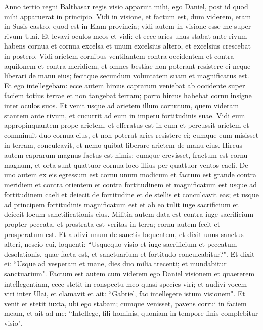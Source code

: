 \begin{biblechapter}  
\verse Anno tertio regni Balthasar regis visio apparuit mihi, ego Daniel, post id quod mihi apparuerat in principio. 
\verse Vidi in visione, et factum est, dum viderem, eram in Susis castro, quod est in Elam provincia; vidi autem in visione esse me super rivum Ulai. 
\verse Et levavi oculos meos et vidi: et ecce aries unus stabat ante rivum habens cornua et cornua excelsa et unum excelsius altero, et excelsius crescebat in postero. 
\verse Vidi arietem cornibus ventilantem contra occidentem et contra aquilonem et contra meridiem, et omnes bestiae non poterant resistere ei neque liberari de manu eius; fecitque secundum voluntatem suam et magnificatus est. 
\verse Et ego intellegebam: ecce autem hircus caprarum veniebat ab occidente super faciem totius terrae et non tangebat terram; porro hircus habebat cornu insigne inter oculos suos. 
\verse Et venit usque ad arietem illum cornutum, quem videram stantem ante rivum, et cucurrit ad eum in impetu fortitudinis suae. 
\verse Vidi eum appropinquantem prope arietem, et efferatus est in eum et percussit arietem et comminuit duo cornua eius, et non poterat aries resistere ei; cumque eum misisset in terram, conculcavit, et nemo quibat liberare arietem de manu eius. 
\verse Hircus autem caprarum magnus factus est nimis; cumque crevisset, fractum est cornu magnum, et orta sunt quattuor cornua loco illius per quattuor ventos caeli. 
\verse De uno autem ex eis egressum est cornu unum modicum et factum est grande contra meridiem et contra orientem et contra fortitudinem 
\verse et magnificatum est usque ad fortitudinem caeli et deiecit de fortitudine et de stellis et conculcavit eas; 
\verse et usque ad principem fortitudinis magnificatum est et ab eo tulit iuge sacrificium et deiecit locum sanctificationis eius. 
\verse Militia autem data est contra iuge sacrificium propter peccata, et prostrata est veritas in terra; cornu autem fecit et prosperatum est. 
\verse Et audivi unum de sanctis loquentem, et dixit unus sanctus alteri, nescio cui, loquenti: “Usquequo visio et iuge sacrificium et peccatum desolationis, quae facta est, et sanctuarium et fortitudo conculcabitur?". 
\verse Et dixit ei: “Usque ad vesperam et mane, dies duo milia trecenti; et mundabitur sanctuarium". 
\verse Factum est autem cum viderem ego Daniel visionem et quaererem intellegentiam, ecce stetit in conspectu meo quasi species viri; 
\verse et audivi vocem viri inter Ulai, et clamavit et ait: “Gabriel, fac intellegere istum visionem".  
\verse Et venit et stetit iuxta, ubi ego stabam; cumque venisset, pavens corrui in faciem meam, et ait ad me: “Intellege, fili hominis, quoniam in tempore finis complebitur visio". 

\end{biblechapter}

